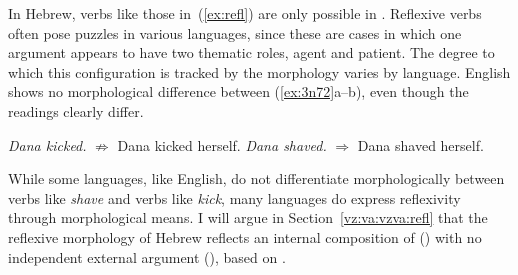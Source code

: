 \begin{exe}
\begin{xlist}
\begin{xlist}
\begin{exe}
\begin{xlist}
\begin{xlist}
\begin{exe}
\begin{xlist}
\begin{xlist}
\begin{exe}
\begin{exe}
\begin{xlist}
\begin{exe}
\begin{exe}
\begin{xlist}
\begin{exe}
\begin{exe}
\begin{exe}
\begin{exe}
\begin{exe}
\begin{xlist}
\begin{exe}
\begin{xlist}
\begin{exe}
\begin{exe}
\begin{xlist}
\begin{exe}
\begin{xlist}
\begin{exe}
\begin{exe}
\begin{exe}
\begin{xlist}
\begin{exe}
\begin{exe}
\begin{exe}
\begin{xlist}
\begin{exe}
\begin{xlist}
\begin{exe}
\begin{xlist}
\begin{exe}
\begin{xlist}
\begin{exe}
\begin{exe}
\begin{exe}
\begin{exe}
\begin{xlist}
\begin{exe}
\begin{xlist}
\begin{exe}
\begin{xlist}
\begin{exe}
\begin{xlist}
\begin{exe}
\begin{xlist}
\begin{exe}
\begin{xlist}
\begin{exe}
\begin{exe}
\begin{exe}
\begin{exe}
\begin{xlist}
\begin{exe}
\begin{xlist}
\begin{exe}
\begin{xlist}
\begin{exe}
\begin{exe}
\begin{xlist}
\begin{exe}
\begin{exe}
\begin{exe}
\begin{exe}
\begin{xlist}
\begin{xlist}
\begin{exe}
\begin{xlist}
\begin{exe}
\begin{exe}
\begin{exe}
\begin{xlist}
\begin{exe}
\begin{exe}
\begin{xlist}
\begin{exe}
\begin{exe}
\begin{exe}
\begin{xlist}
\begin{xlist}
In Hebrew, verbs like those in~(\ref{ex:refl}) are only possible in {\thit}. Reflexive verbs often pose puzzles in various languages, since these are cases in which one argument appears to have two thematic roles, agent and patient. The degree to which this configuration is tracked by the morphology varies by language. English shows no morphological difference between (\ref{ex:3n72}a--b), even though the readings clearly differ.
 \begin{exe}
 \ex  \label{ex:3n72}
 \begin{xlist} 
 	\ex \emph{Dana kicked.} 
		$\nRightarrow$ Dana kicked herself.
 	\ex  \emph{Dana shaved.} 
		$\Rightarrow$ Dana shaved herself.
 \z
\z 

While some languages, like English, do not differentiate morphologically between verbs like \emph{shave} and verbs like \emph{kick}, many languages do express reflexivity through morphological means. I will argue in Section~\ref{vz:va:vzva:refl} that the reflexive morphology of Hebrew reflects an internal composition of  (\va) with no independent external argument (\vz), based on \cite{kastner17gjgl}.


\end{xlist}
\end{exe}
\end{xlist}
\end{xlist}
\end{exe}
\end{exe}
\end{exe}
\end{xlist}
\end{exe}
\end{exe}
\end{xlist}
\end{exe}
\end{exe}
\end{exe}
\end{xlist}
\end{exe}
\end{xlist}
\end{xlist}
\end{exe}
\end{exe}
\end{exe}
\end{exe}
\end{xlist}
\end{exe}
\end{exe}
\end{xlist}
\end{exe}
\end{xlist}
\end{exe}
\end{xlist}
\end{exe}
\end{exe}
\end{exe}
\end{exe}
\end{xlist}
\end{exe}
\end{xlist}
\end{exe}
\end{xlist}
\end{exe}
\end{xlist}
\end{exe}
\end{xlist}
\end{exe}
\end{xlist}
\end{exe}
\end{exe}
\end{exe}
\end{exe}
\end{xlist}
\end{exe}
\end{xlist}
\end{exe}
\end{xlist}
\end{exe}
\end{xlist}
\end{exe}
\end{exe}
\end{exe}
\end{xlist}
\end{exe}
\end{exe}
\end{exe}
\end{xlist}
\end{exe}
\end{xlist}
\end{exe}
\end{exe}
\end{xlist}
\end{exe}
\end{xlist}
\end{exe}
\end{exe}
\end{exe}
\end{exe}
\end{exe}
\end{xlist}
\end{exe}
\end{exe}
\end{xlist}
\end{exe}
\end{exe}
\end{xlist}
\end{xlist}
\end{exe}
\end{xlist}
\end{xlist}
\end{exe}
\end{xlist}
\end{xlist}
\end{exe}
